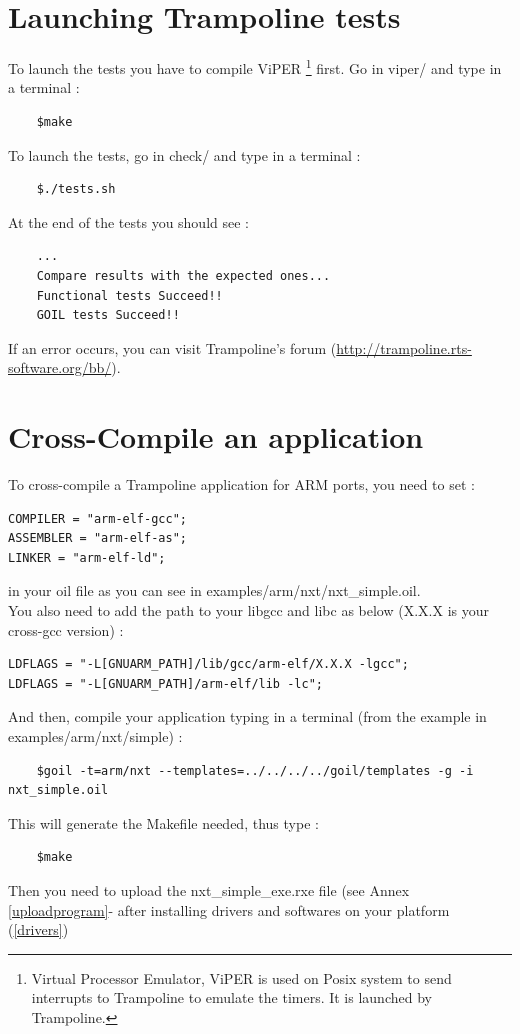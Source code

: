 \section{Launching Trampoline tests} \label{tests}
To launch the tests you have to compile ViPER \footnote{Virtual Processor Emulator, ViPER is used on Posix system to send interrupts to Trampoline to emulate the timers. It is launched by Trampoline.} first. Go in viper/ and type in a terminal :
	\begin{verbatim}
	$make
	\end{verbatim}
To launch the tests, go in check/ and type in a terminal :
	\begin{verbatim}
	$./tests.sh
	\end{verbatim}
At the end of the tests you should see :
	\begin{verbatim}
	...
	Compare results with the expected ones...
	Functional tests Succeed!!
	GOIL tests Succeed!!
	\end{verbatim}
If an error occurs, you can visit Trampoline's forum (\href{http://trampoline.rts-software.org/bb/}{http://trampoline.rts-software.org/bb/}).


\section{Cross-Compile an application} \label{compileanapplication}
To cross-compile a Trampoline application for ARM ports, you need to set  :
\begin{verbatim}
COMPILER = "arm-elf-gcc";
ASSEMBLER = "arm-elf-as";
LINKER = "arm-elf-ld";
\end{verbatim}
in your oil file as you can see in examples/arm/nxt/nxt\_simple.oil.\\
You also need to add the path to your libgcc and libc as below (X.X.X is your cross-gcc version) :
\begin{verbatim}
LDFLAGS = "-L[GNUARM_PATH]/lib/gcc/arm-elf/X.X.X -lgcc";
LDFLAGS = "-L[GNUARM_PATH]/arm-elf/lib -lc";
\end{verbatim}



And then, compile your application typing in a terminal (from the example in examples/arm/nxt/simple) :
	\begin{verbatim}
	$goil -t=arm/nxt --templates=../../../../goil/templates -g -i nxt_simple.oil
	\end{verbatim}
This will generate the Makefile needed, thus type :
	\begin{verbatim}
	$make
	\end{verbatim}
Then you need to upload the nxt\_simple\_exe.rxe file (see Annex \ref{uploadprogram}- after installing drivers and softwares on your platform (\ref{drivers})

